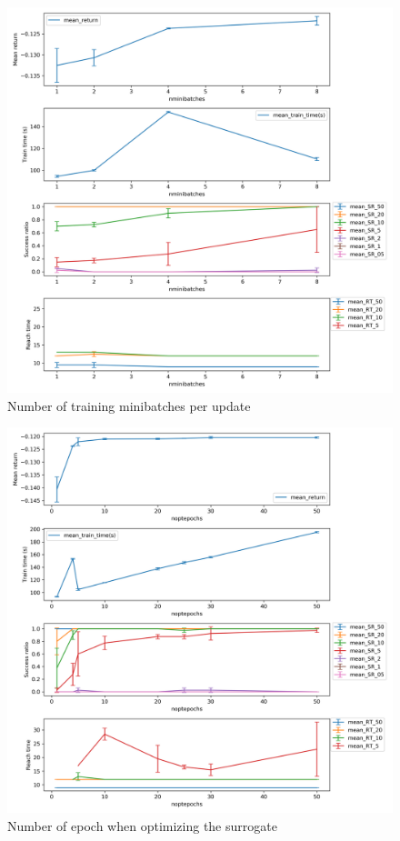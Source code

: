 \documentclass{article}
\begin{document}
\begin{figure}[H]
    \centering
    \includegraphics[width=\textwidth]{../ppo2_nminibatches.png}
\caption{Number of training minibatches per update}
\end{figure}

\begin{figure}[H]
    \centering
    \includegraphics[width=\textwidth]{../ppo2_noptepochs.png}
\caption{Number of epoch when optimizing the surrogate}
\end{figure}
\end{document}

